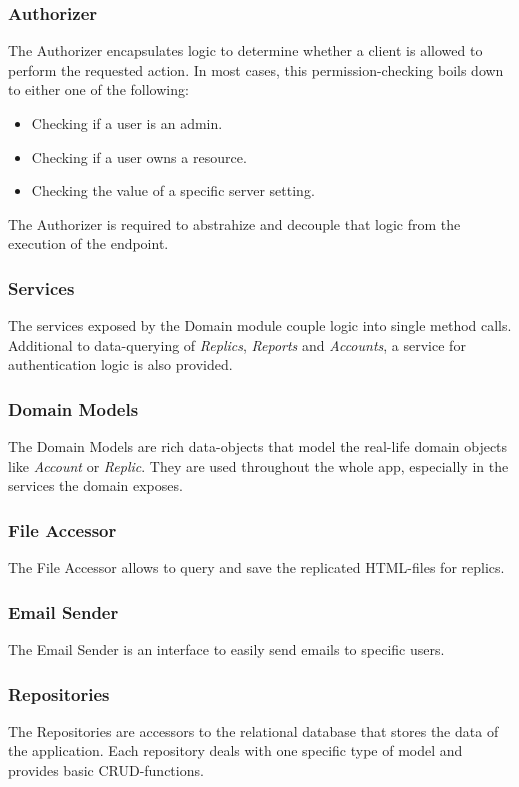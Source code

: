 \subsubsection{Authorizer}
The Authorizer encapsulates logic to determine whether a client is allowed to perform the requested action.
In most cases, this permission-checking boils down to either one of the following:
\begin{itemize}
    \item Checking if a user is an admin.
    \item Checking if a user owns a resource.
    \item Checking the value of a specific server setting.
\end{itemize}
The Authorizer is required to abstrahize and decouple that logic from the execution of the endpoint.

\subsubsection{Services}
The services exposed by the Domain module couple logic into single method calls.
Additional to data-querying of \textit{Replics}, \textit{Reports} and \textit{Accounts}, a service for authentication logic is also provided.

\subsubsection{Domain Models}
The Domain Models are rich data-objects that model the real-life domain objects like \textit{Account} or \textit{Replic}.
They are used throughout the whole app, especially in the services the domain exposes.

\subsubsection{File Accessor}
The File Accessor allows to query and save the replicated HTML-files for replics.

\subsubsection{Email Sender}
The Email Sender is an interface to easily send emails to specific users.

\subsubsection{Repositories}
The Repositories are accessors to the relational database that stores the data of the application. \newline
Each repository deals with one specific type of model and provides basic CRUD-functions.

